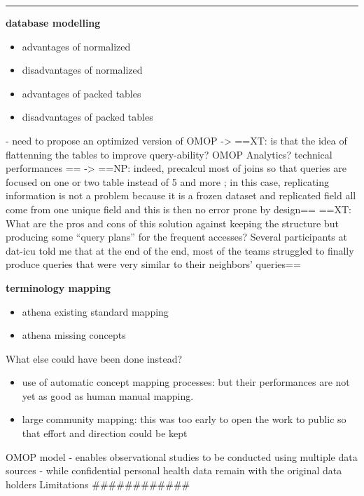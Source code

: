 \begin{center}\rule{0.5\linewidth}{\linethickness}\end{center}

\textbf{database modelling}

\begin{itemize}
\tightlist
\item
  advantages of normalized
\item
  disadvantages of normalized
\item
  advantages of packed tables
\item
  disadvantages of packed tables
\end{itemize}

- need to propose an optimized version of OMOP -\textgreater{} ==XT: is
that the idea of flattenning the tables to improve query-ability? OMOP
Analytics? technical performances == -\textgreater{} ==NP: indeed,
precalcul most of joins so that queries are focused on one or two table
instead of 5 and more ; in this case, replicating information is not a
problem because it is a frozen dataset and replicated field all come
from one unique field and this is then no error prone by design== ==XT:
What are the pros and cons of this solution against keeping the
structure but producing some ``query plans'' for the frequent accesses?
Several participants at dat-icu told me that at the end of the end, most
of the teams struggled to finally produce queries that were very similar
to their neighbors' queries==

\textbf{terminology mapping}

\begin{itemize}
\tightlist
\item
  athena existing standard mapping
\item
  athena missing concepts
\end{itemize}

What else could have been done instead?

\begin{itemize}
\tightlist
\item
  use of automatic concept mapping processes: but their performances are
  not yet as good as human manual mapping.
\item
  large community mapping: this was too early to open the work to public
  so that effort and direction could be kept
\end{itemize}

OMOP model - enables observational studies to be conducted using
multiple data sources - while confidential personal health data remain
with the original data holders Limitations \#\#\#\#\#\#\#\#\#\#\#\#

